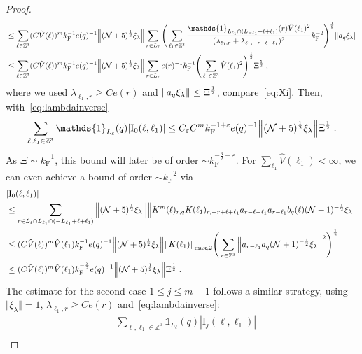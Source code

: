 \documentclass[12pt,a4paper]{article}
\numberwithin{equation}{section}
\newcommand{\1}{\mathbb{I}}
\newcommand{\F}{\mathrm{F}}
\newcommand{\I}{\mathrm{I}}
\newcommand{\Zstar}{\mathbb{Z}^3} %
\newcommand{\Z}{\mathbb{Z}}
\newcommand{\NN}{\mathcal{N}}
\newcommand{\half}{\frac{1}{2}}
\theoremstyle{plain}
\theoremstyle{definition}
\theoremstyle{remark}
\theoremstyle{plain}
\theoremstyle{definition}
\theoremstyle{remark}
\begin{document}
\begin{proof}
\begin{align}
	 &\leq \sum_{\ell \in \Zstar} (C \hat{V}(\ell))^m k_{\F}^{-1} e(q)^{-1}
	 	\norm{ (\NN+5)^{\half} \xi_\lambda}
	 	\sum_{r \in L_\ell} \Bigg( \sum_{\ell_1 \in \Zstar} \frac{\mathds{1}_{L_{\ell_1} \cap (L_{-\ell_1}+\ell+\ell_1)}(r) \hat{V}(\ell_1)^2}{(\lambda_{\ell_1,r} + \lambda_{\ell_1,-r+\ell+\ell_1})^2} k_{\F}^{-2} \Bigg)^{\half} \norm{ a_q \xi_\lambda } \nonumber\\
	 &\leq \sum_{\ell \in \Zstar} (C \hat{V}(\ell))^m k_{\F}^{-1} e(q)^{-1}
	 	\norm{ (\NN+5)^{\half} \xi_\lambda}
	 	\sum_{r \in L_\ell} e(r)^{-1} k_{\F}^{-1} \Bigg( \sum_{\ell_1 \in \Zstar} \hat{V}(\ell_1)^2 \Bigg)^{\half} \Xi^\half \;,
\end{align}
where we used $ \lambda_{\ell_1,r} \ge C e(r) $ and $ \norm{ a_q \xi_\lambda} \le \Xi^\half $, compare~\eqref{eq:Xi}. Then, with~\eqref{eq:lambdainverse}
\begin{align}
	\sum_{\ell,\ell_1 \in \Zstar} \mathds{1}_{L_\ell}(q) |\I_0(\ell, \ell_1)|
	\leq C_\varepsilon C^m k_{\F}^{-1+\varepsilon} e(q)^{-1}
	 	\norm{ (\NN+5)^{\half} \xi_\lambda}
	 	\Xi^{\half}	\;.
\label{eq:estEQ1121_Coulomb}
\end{align}
As $ \Xi \sim k_{\F}^{-1} $, this bound will later be of order $ \sim k_{\F}^{-\frac 32 + \varepsilon} $. For $ \sum_{\ell_1} \hat{V}(\ell_1) < \infty $, we can even achieve a bound of order $ \sim k_{\F}^{-2} $ via
\begin{align}
	&|\I_0(\ell, \ell_1)| \nonumber\\
	&\leq \sum\limits_{r\in L_{\ell} \cap L_{\ell_1}\cap (-L_{\ell_1}+\ell+\ell_1)}
		\norm{ (\NN+5)^{\half} \xi_\lambda} 
		\norm{ K^m(\ell )_{r,q} K(\ell_1)_{r,-r+\ell+\ell_1} a_{r-\ell-\ell_1} a_{r-\ell_1} b_{q}(\ell) (\NN+1)^{-\half} \xi_\lambda }\nonumber\\
	 &\leq (C \hat{V}(\ell))^m \hat{V}(\ell_1) k_{\F}^{-1} e(q)^{-1}
	 	\norm{ (\NN+5)^{\half} \xi_\lambda} \norm{K(\ell_1) }_{\max,2}
	 	\Bigg( \sum\limits_{r\in \Z^3} \norm{ a_{r-\ell_1} a_q (\NN+1)^{-\half} \xi_\lambda }^2 \Bigg)^\half \nonumber\\
	 &\leq (C \hat{V}(\ell))^m \hat{V}(\ell_1)
	 	k_{\F}^{-\frac 32} e(q)^{-1}
	 	\norm{(\NN+5)^{\half} \xi_\lambda}
	 	\Xi^{\half} \;.
\label{eq:estEQ1121}
\end{align}
The estimate for the second case $ 1 \le j \le m-1 $ follows a similar strategy, using $ \Vert \xi_\lambda \Vert = 1 $, $ \lambda_{\ell_1,r} \ge C e(r) $ and~\eqref{eq:lambdainverse}:
\begin{align}
	&\sum_{\ell,\ell_1 \in \Zstar} \mathds{1}_{L_\ell}(q) |\I_j(\ell, \ell_1)| \nonumber\\

\end{align}
\end{proof}
\end{document}
